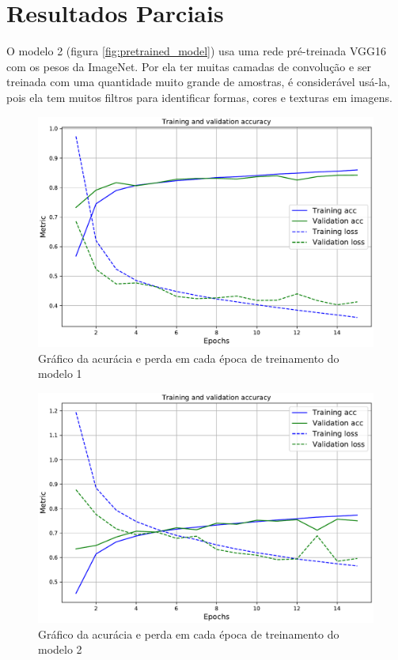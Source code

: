 \section*{Resultados Parciais}
O modelo 2 (figura \ref{fig:pretrained_model}) usa uma rede pré-treinada VGG16 com os pesos da ImageNet. Por ela ter muitas camadas de convolução e ser treinada com uma quantidade muito grande de amostras, é considerável usá-la, pois ela tem muitos filtros para identificar formas, cores e texturas em imagens.

\pagebreak
\begin{figure}[h!]
  \centering
  \includegraphics[width=.78\textwidth]{figures/conv_train.pdf}
  \caption{Gráfico da acurácia e perda em cada época de treinamento do modelo 1}
  \label{fig:conv_train}
\end{figure}

\begin{figure}[h!]
  \centering
  \includegraphics[width=.78\textwidth]{figures/pretrained_train.pdf}
  \caption{Gráfico da acurácia e perda em cada época de treinamento do modelo 2}
  \label{fig:pretrained_train}
\end{figure}